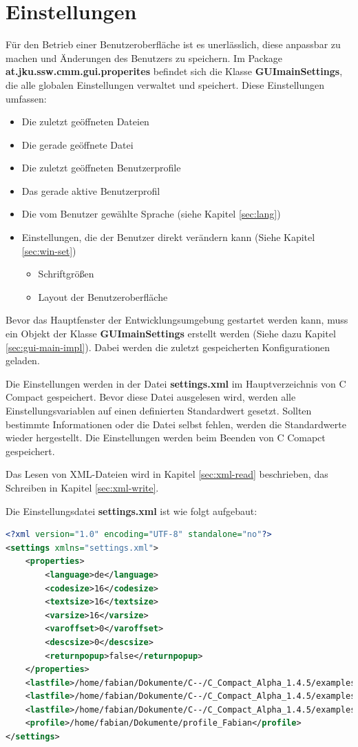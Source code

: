 \section{Einstellungen}
\label{sec:guimainsettings}
Für den Betrieb einer Benutzeroberfläche ist es unerlässlich, diese anpassbar zu machen und Änderungen des Benutzers zu speichern. Im Package \textbf{at.jku.ssw.cmm.gui.properites} befindet sich die Klasse \textbf{GUImainSettings}, die alle globalen Einstellungen verwaltet und speichert. Diese Einstellungen umfassen:
\begin{itemize}
\item Die zuletzt geöffneten Dateien
\item Die gerade geöffnete Datei
\item Die zuletzt geöffneten Benutzerprofile
\item Das gerade aktive Benutzerprofil
\item Die vom Benutzer gewählte Sprache (siehe Kapitel \ref{sec:lang})
\item Einstellungen, die der Benutzer direkt verändern kann (Siehe Kapitel \ref{sec:win-set})
\begin{itemize}
\item Schriftgrößen
\item Layout der Benutzeroberfläche
\end{itemize}
\end{itemize}

Bevor das Hauptfenster der Entwicklungsumgebung gestartet werden kann, muss ein Objekt der Klasse \textbf{GUImainSettings} erstellt werden (Siehe dazu Kapitel \ref{sec:gui-main-impl}). Dabei werden die zuletzt gespeicherten Konfigurationen geladen.

Die Einstellungen werden in der Datei \textbf{settings.xml} im Hauptverzeichnis von C Compact gespeichert. Bevor diese Datei ausgelesen wird, werden alle Einstellungsvariablen auf einen definierten Standardwert gesetzt. Sollten bestimmte Informationen oder die Datei selbst fehlen, werden die Standardwerte wieder hergestellt. Die Einstellungen werden beim Beenden von C Comapct gespeichert.

Das Lesen von XML-Dateien wird in Kapitel \ref{sec:xml-read} beschrieben, das Schreiben in Kapitel \ref{sec:xml-write}. 

Die Einstellungsdatei \textbf{settings.xml} ist wie folgt aufgebaut:
\begin{lstlisting}[language=XML]
<?xml version="1.0" encoding="UTF-8" standalone="no"?>
<settings xmlns="settings.xml">
	<properties>
		<language>de</language>
		<codesize>16</codesize>
		<textsize>16</textsize>
		<varsize>16</varsize>
		<varoffset>0</varoffset>
		<descsize>0</descsize>
		<returnpopup>false</returnpopup>
	</properties>
	<lastfile>/home/fabian/Dokumente/C--/C_Compact_Alpha_1.4.5/examples/helloworld/helloworld.cmm</lastfile>
	<lastfile>/home/fabian/Dokumente/C--/C_Compact_Alpha_1.4.5/examples/random/random.cmm</lastfile>
	<lastfile>/home/fabian/Dokumente/C--/C_Compact_Alpha_1.4.5/examples/bubblesort/bubblesort.cmm</lastfile>
	<profile>/home/fabian/Dokumente/profile_Fabian</profile>
</settings>
\end{lstlisting}

